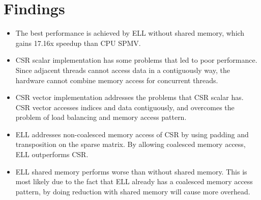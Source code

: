 \documentclass[a4paper,11pt,BCOR10mm,oneside,headsepline]{scrartcl}
\begin{document}
	\section{Findings}
		\begin{itemize}
			\item The best performance is achieved by ELL without shared memory, which gains 17.16x speedup than CPU SPMV.
			\item CSR scalar implementation has some problems that led to poor performance. Since adjacent threads cannot access data in a contiguously way, the hardware cannot combine memory access for concurrent threads.
			\item CSR vector implementation addresses the problems that CSR scalar has. CSR vector accesses indices and data contiguously, and overcomes the problem of load balancing and memory access pattern.
			\item ELL addresses non-coalesced memory access of CSR by using padding and transposition on the sparse matrix. By allowing coalesced memory access, ELL outperforms CSR.
			\item ELL shared memory performs worse than without shared memory. This is most likely due to the fact that ELL already has a coalesced memory access pattern, by doing reduction with shared memory will cause more overhead.
		\end{itemize}
	
\end{document}
